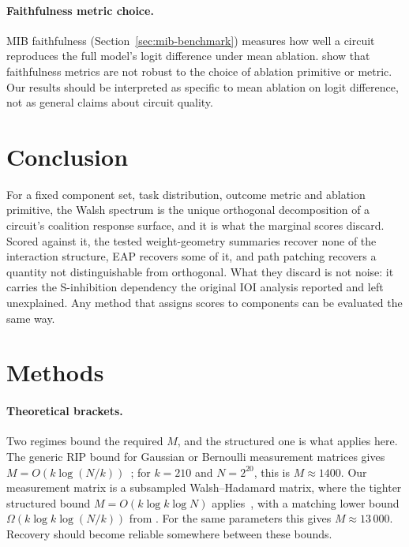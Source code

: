 \documentclass{article}
\begin{document}
\paragraph{Faithfulness metric choice.}

MIB faithfulness (Section~\ref{sec:mib-benchmark}) measures how well a
circuit reproduces the full model's logit difference under mean ablation.
\citet{miller2024transformer} show that faithfulness metrics are not
robust to the choice of ablation primitive or metric. Our results should
be interpreted as specific to mean ablation on logit difference, not as
general claims about circuit quality.



\section{Conclusion}
\label{sec:conclusion}

For a fixed component set, task distribution, outcome metric and ablation primitive, the Walsh
spectrum is the unique orthogonal decomposition of a circuit's coalition response surface, and it
is what the marginal scores discard. Scored against it, the tested weight-geometry summaries recover
none of the interaction structure, EAP recovers some of it, and path patching recovers a quantity
not distinguishable from orthogonal. What they discard is not noise: it carries the S-inhibition
dependency the original IOI analysis reported and left unexplained. Any method that assigns scores
to components can be evaluated the same way.





\appendix

\section{Methods}

\paragraph{Theoretical brackets.}

Two regimes bound the required $M$, and the structured one is what applies here. The generic RIP bound for Gaussian or Bernoulli measurement matrices gives
$M = O(k \log(N/k))$~\citep{candes2005decoding}; for $k=210$ and
$N = 2^{20}$, this is $M \approx 1400$. Our measurement matrix is a
subsampled Walsh--Hadamard matrix, where the tighter structured bound
$M = O(k \log k \log N)$ applies~\citep{bourgain2014,rudelson2008sparse},
with a matching lower bound $\Omega(k \log k \log(N/k))$ from
\citet{blasiok2019sparse}. For the same parameters this gives $M \approx 13\,000$.
Recovery should become reliable somewhere between these bounds.
\end{document}
